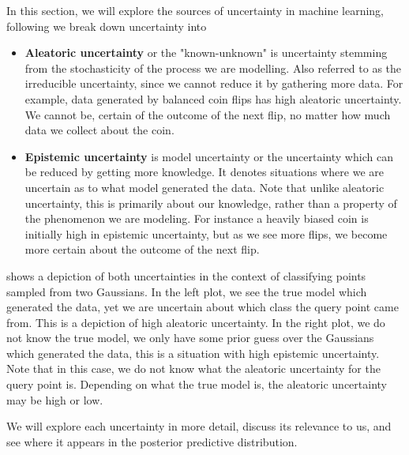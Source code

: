 \documentclass[../main.tex]{subfiles}
\begin{document}
In this section, we will explore the sources of uncertainty in machine learning, following \citet{der2009aleatory} we break down uncertainty into

\begin{itemize}
    \item \textbf{Aleatoric uncertainty} or the "known-unknown" is uncertainty stemming from the stochasticity of the process we are modelling. Also referred to as the irreducible uncertainty, since we cannot reduce it by gathering more data. For example, data generated by balanced coin flips has high aleatoric uncertainty. We cannot be, certain of the outcome of the next flip, no matter how much data we collect about the coin. 

    \item \textbf{Epistemic uncertainty} is model uncertainty or the uncertainty which can be reduced by getting more knowledge. It denotes situations where we are uncertain as to what model generated the data.
    Note that unlike aleatoric uncertainty, this is primarily about our knowledge, rather than a property of the phenomenon we are modeling. For instance a heavily biased coin is initially high in epistemic uncertainty, but as we see more flips, we become more certain about the outcome of the next flip.
\end{itemize}

 shows a depiction of both uncertainties in the context of classifying points sampled from two Gaussians. In the left plot, we see the true model which generated the data, yet we are uncertain about which class the query point came from. This is a depiction of high aleatoric uncertainty. 
In the right plot, we do not know the true model, we only have some prior guess over the Gaussians which generated the data, this is a situation with high epistemic uncertainty. Note that in this case, we do not know what the aleatoric uncertainty for the query point is. Depending on what the true model is, the aleatoric uncertainty may be high or low. 

We will explore each uncertainty in more detail, discuss its relevance to us, and see where it appears in the posterior predictive distribution. 
\end{document}

